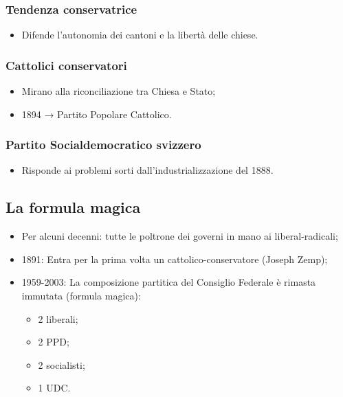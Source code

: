 \documentclass{article}
\begin{document}
\subsubsection{Tendenza conservatrice}
\begin{itemize}
    \item Difende l’autonomia dei cantoni e la libertà delle chiese.
\end{itemize}

\subsubsection{Cattolici conservatori}
\begin{itemize}
    \item Mirano alla riconciliazione tra Chiesa e Stato;
    \item 1894 → Partito Popolare Cattolico.
\end{itemize}

\subsubsection{Partito Socialdemocratico svizzero}
\begin{itemize}
    \item Risponde ai problemi sorti dall’industrializzazione del 1888.
\end{itemize}

\subsection{La formula magica}
\begin{itemize}
    \item Per alcuni decenni: tutte le poltrone dei governi in mano ai liberal-radicali;
    \item 1891: Entra per la prima volta un cattolico-conservatore (Joseph Zemp);
    \item 1959-2003: La composizione partitica del Consiglio Federale è rimasta immutata
        (formula magica):
        \begin{itemize}
            \item 2 liberali;
            \item 2 PPD;
            \item 2 socialisti;
            \item 1 UDC.
        \end{itemize}
\end{itemize}
\end{document}
